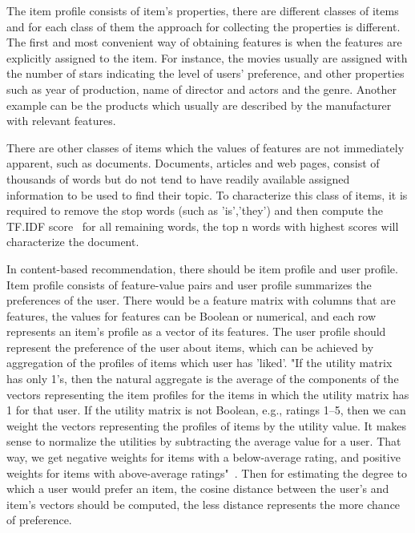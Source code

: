 The item profile consists of item's properties, there are different classes of items and for each class of them the approach for collecting the properties is different. The first and most convenient way of obtaining features is when the features are explicitly assigned to the item. For instance, the movies usually are assigned with the number of stars indicating the level of users' preference, and other properties such as year of production, name of director and actors and the genre. Another example can be the products which usually are described by the manufacturer with relevant features. 

There are other classes of items which the values of features are not immediately apparent, such as documents. Documents, articles and web pages, consist of thousands of words but do not tend to have readily available assigned information to be used to find their topic. To characterize this class of items, it is required to remove the stop words (such as 'is','they') and then compute the TF.IDF score~\cite{ramos2003using} for all remaining words, the top n words with highest scores will characterize the document.


In content-based recommendation, there should be item profile and user profile. Item proﬁle consists of feature-value pairs and user proﬁle summarizes the preferences of the user. There would be a feature matrix with columns that are features, the values for features can be Boolean or numerical, and each row represents an item's profile as a vector of its features. The user profile should represent the preference of the user about items, which can be achieved by aggregation of the proﬁles of items which user has 'liked'. "If the utility matrix has only 1’s, then the natural aggregate is the average of the components of the vectors representing the item proﬁles for the items in which the utility
matrix has 1 for that user. If the utility matrix is not Boolean, e.g., ratings 1–5, then we can weight the vectors representing the proﬁles of items by the utility value. It makes sense to normalize the utilities by subtracting the average value for a user. That way, we get negative weights for items with a below-average rating, and positive weights for items with above-average ratings"~\cite{rajaraman2011mining}.
Then for estimating the degree to which a user would prefer an item, the cosine distance between the user’s and item’s vectors should be computed, the less distance represents the more chance of preference.

